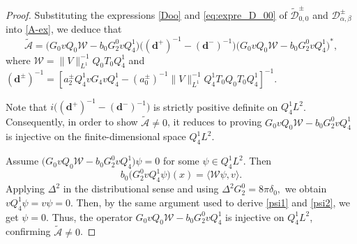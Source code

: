 \documentclass[reqno]{amsart}
\numberwithin{equation}{section}
\begin{document}
\begin{proof}
	Substituting the expressions \eqref{Doo} and \eqref{eq:expre_D_00} of $\widetilde{\mathcal{D}}_{0,0}^{\pm}$ and $\mathcal{D}_{\alpha,\beta}^{\pm}$ into \eqref{A-ex}, we deduce that 
	\[  
	\widetilde{\mathcal{A}} = \bigl(G_0vQ_0\mathcal{W}-b_0G_2^0vQ_{4}^1\bigr)\bigl((\boldsymbol{d}^+)^{-1} - (\boldsymbol{d}^-)^{-1}\bigr)\bigl(G_0vQ_0\mathcal{W}-b_0G_2^0vQ_{4}^1\bigr)^*,
	\]  
	where $\mathcal{W} = \|V\|_{L^1}^{-1}Q_0 T_0 Q_4^1$ and  
$
(\boldsymbol{d}^\pm)^{-1} = [a_2^\pm Q_4^1 v G_4 v Q_4^1 - (a_0^\pm)^{-1} \|V\|_{L^1}^{-1} Q_4^1 T_0  Q_0 T_0 Q_4^1]^{-1}.  
$ 

	Note that 
	$
	i \bigl((\boldsymbol{d}^+)^{-1} - (\boldsymbol{d}^-)^{-1}\bigr)  
	$ is strictly positive definite on $Q_{4}^1 L^2$. Consequently, in order to show $\widetilde{\mathcal{A}} \neq 0$, it reduces to proving $G_0vQ_0\mathcal{W}-b_0G_2^0vQ_{4}^1$ is injective  on the finite-dimensional space $Q_{4}^1 L^2$.  
	
	Assume $\bigl(G_0vQ_0\mathcal{W}-b_0G_2^0vQ_{4}^1\bigr)\psi = 0$ for some $\psi \in Q_{4}^1 L^2$. Then
	\[
		b_0 \bigl(G_2^0 v Q_{4}^1 \psi\bigr)(x) = \langle \mathcal{W} \psi, v \rangle.  
	\]  
Applying $\Delta^2$ in the distributional sense and
	using
	$
	\Delta^2G_2^0
	=
	8\pi\delta_0,
	$
	we obtain
	$
	vQ_4^1\psi=v\psi=0.
	$ Then, by the same argument used to derive \eqref{psi1} and \eqref{psi2}, we get \(\psi=0\).
Thus, the operator $G_0vQ_0\mathcal{W}-b_0G_2^0vQ_{4}^1$ is injective on $Q_{4}^1 L^2$, confirming $\widetilde{\mathcal{A}} \neq 0$.  
\end{proof}  
\end{document}
